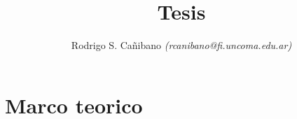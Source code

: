 \documentclass[a4paper]{report}
\title{Tesis}
\author{Rodrigo S. Cañibano \emph{(rcanibano@fi.uncoma.edu.ar)}}
\begin{document}
\maketitle

\chapter{Marco teorico}










\end{document}
